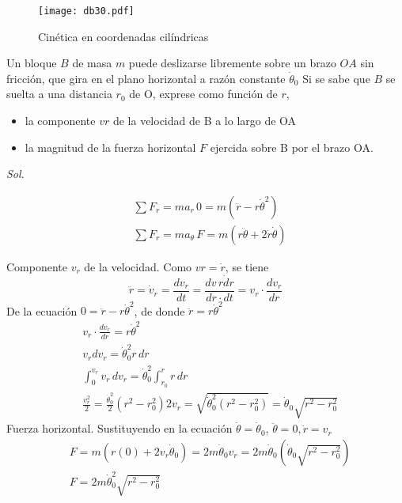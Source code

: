 \begin{figure}[h!]
\centering
  \texttt{[image: db30.pdf]}
  \caption{Cinética en coordenadas cilíndricas}
  \label{db30}
\end{figure}

\begin{example}
    Un bloque $B$ de masa $m$ puede deslizarse libremente sobre un brazo $OA$ sin fricción, que gira en el plano horizontal a razón constante $\dot{\theta}_0$ Si se sabe que $B$ se suelta a una distancia $r_0$ de O, exprese como función de $r$,
\begin{itemize}
    \item la componente $vr$ de la velocidad de B a lo largo de OA
    \item la magnitud de la fuerza horizontal $F$ ejercida sobre B por el brazo OA.
\end{itemize}
\end{example}

\textit{ Sol. }

\begin{align*}
    &\sum F_r = ma_r\, 0 = m\left(\ddot{r} - r\dot{\theta}^2\right)\\
    &\sum F_r = ma_{\theta}\, F= m\left(r\ddot{\theta} + 2\dot{r}\dot{\theta}\right)
\end{align*}

Componente $v_r$ de la velocidad. Como $vr=\dot{r}$, se tiene
\begin{equation*}
    \ddot{r} =\dot{v}_r =\frac{dv_r}{dt} =\frac{dv\,r\dot dr}{dr\cdot dt} = v_r\cdot \frac{dv_r}{dr}
\end{equation*}
De la ecuación $0=\ddot{r}-r\dot{\theta}^2$, de donde $\ddot{r}=r\dot{\theta}^2$
\begin{align*}
    &v_r\cdot \frac{dv_r}{dr} = r\dot{\theta}^2\\
    &v_rdv_r =\dot{\theta}_0^2r\,dr\\
    &\int_0^{v_r}v_r\,dv_r =\dot{\theta}_0^2\int_{r_0}^rr\,dr\\
    &\frac{v_r^2}{2} =\frac{\dot{\theta}_0^2}{2}\left(r^2 - r^2_0\right)2
    v_r = \sqrt{\dot{\theta}_0^2\left(r^2 - r_0^2\right)} =\dot{\theta}_0\sqrt{r^2 - r_0^2}
\end{align*}
Fuerza horizontal. Sustituyendo en la ecuación $\dot{\theta}=\dot{\theta}_0$, $\ddot{\theta}=0,\dot{r}=v_r$
\begin{align*}
    &F = m\left(r(0) + 2v_r\dot{\theta}_0\right) = 2m\dot{\theta}_0 v_r =2m\dot{\theta}_0\left(\dot{\theta}_0\sqrt{r^2 - r_0^2}\right)\\
    &F = 2m\dot{\theta}_0^2\sqrt{r^2 - r_0^2}
\end{align*}

